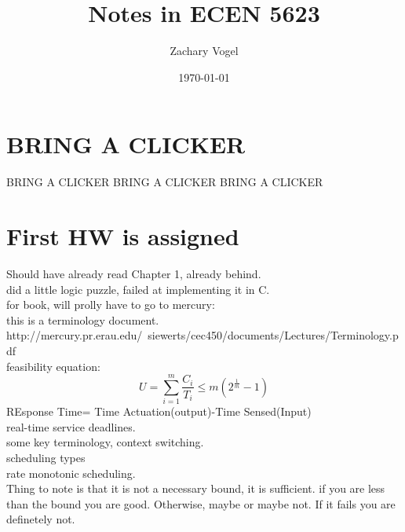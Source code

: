 \documentclass{article}
\author{Zachary Vogel}
\date{\today}
\title{Notes in ECEN 5623}
\begin{document}
\maketitle


\section*{BRING A CLICKER}
BRING A CLICKER
BRING A CLICKER
BRING A CLICKER

\section*{First HW is assigned}
Should have already read Chapter 1, already behind.\\
did a little logic puzzle, failed at implementing it in C.\\

for book, will prolly have to go to mercury:\\
this is a terminology document.\\
http://mercury.pr.erau.edu/~siewerts/cec450/documents/Lectures/Terminology.pdf\\

feasibility equation:
\[U=\sum_{i=1}^m\frac{C_i}{T_i}\leq m(2^{\frac{1}{m}}-1)\]
REsponse Time= Time Actuation(output)-Time Sensed(Input)\\

real-time service deadlines.\\

some key terminology, context switching.\\

scheduling types\\

rate monotonic scheduling.\\
Thing to note is that it is not a necessary bound, it is sufficient. if you are less than the bound you are good. Otherwise, maybe or maybe not. If it fails you are definetely not.\\
\end{document}
